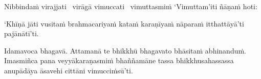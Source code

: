 \begin{pali-hang}
  Nibbindaṁ virajjati \breathmark\ virāgā vimuccati \breathmark\ vimuttasmiṁ `Vimuttam'iti ñāṇaṁ hoti:
\end{pali-hang}

\begin{pali-hang}
  `Khīṇā jāti vusitaṁ brahmacariyaṁ kataṁ karaṇīyaṁ nāparaṁ itthattāyā'ti pajānātī'ti.
\end{pali-hang}

\begin{pali-hang}
  Idamavoca bhagavā. Attamanā te bhikkhū bhagavato bhāsitaṁ abhinanduṁ. Imasmiñca pana veyyākaraṇasmiṁ bhaññamāne tassa bhikkhusahassassa anupādāya āsavehi cittāni vimucciṁsū'ti.
\end{pali-hang}

\suttaRef{[SN 35.28]}


